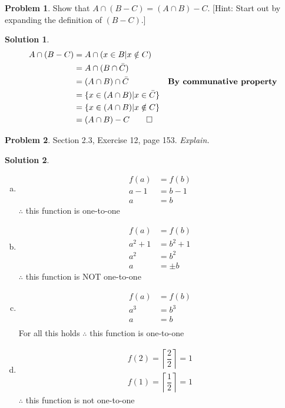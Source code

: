 \documentclass{article}
\theoremstyle{definition}
\newtheorem{problem}{Problem}
\newtheorem*{solution}{Solution}
\begin{document}
\begin{problem} Show that $A\cap (B - C) = (A\cap B) - C$.
[Hint: Start out by expanding the definition of $(B - C)$.]
\end{problem}
\begin{solution}
\begin{align*}
  A \cap (B - C) &= A \cap (x \in B | x \notin C ) \\
  &= A \cap (B \cap \bar C) \\
  &= (A \cap B) \cap \bar C &\textbf{By communative property} \\
  &= \{x \in (A \cap B) | x \in \bar C \} \\
  &= \{x \in (A \cap B) | x \notin C \} \\
  &= (A \cap B) - C \qed
\end{align*}
\end{solution}

\begin{problem} Section 2.3, Exercise 12, page 153. \textsl{Explain.} 
\end{problem}
\begin{solution}
\begin{enumerate}[a)]
  \item 
  \begin{align*}
    f(a) &= f(b) \\
    a-1 &= b-1 \\
    a &= b
  \end{align*}
  $\therefore$ this function is one-to-one
  
  \item
  \begin{align*}
    f(a) &= f(b) \\
    a^2 + 1 &= b^2 + 1 \\
    a^2 &= b^2 \\
    a &= \pm b
  \end{align*}
  $\therefore$ this function is NOT one-to-one
  \item
  \begin{align*}
    f(a) &= f(b) \\
    a^3 &= b^3 \\
    a &= b \\
  \end{align*}
  For all this holds $\therefore$ this function is one-to-one
  \item
  \begin{align*}
    f(2) = \left \lceil \dfrac{2}{2} \right\rceil = 1 \\
    f(1) = \left \lceil \dfrac{1}{2} \right\rceil = 1
  \end{align*}
  $\therefore$ this function is not one-to-one
\end{enumerate}
\end{solution}
\end{document}
